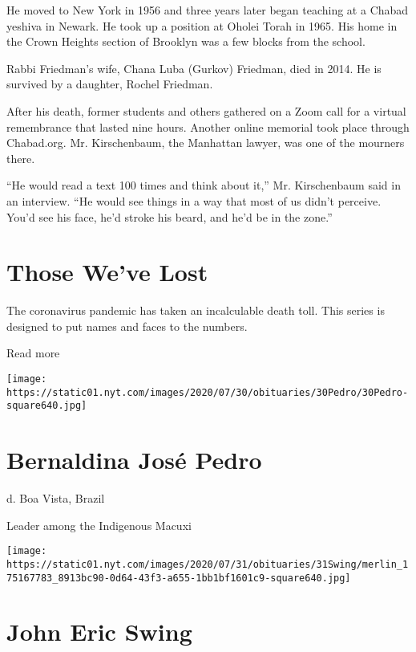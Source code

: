 He moved to New York in 1956 and three years later began teaching at a
Chabad yeshiva in Newark. He took up a position at Oholei Torah in 1965.
His home in the Crown Heights section of Brooklyn was a few blocks from
the school.

Rabbi Friedman's wife, Chana Luba (Gurkov) Friedman, died in 2014. He is
survived by a daughter, Rochel Friedman.

After his death, former students and others gathered on a Zoom call for
a virtual remembrance that lasted nine hours. Another online memorial
took place through Chabad.org. Mr. Kirschenbaum, the Manhattan lawyer,
was one of the mourners there.

``He would read a text 100 times and think about it,'' Mr. Kirschenbaum
said in an interview. ``He would see things in a way that most of us
didn't perceive. You'd see his face, he'd stroke his beard, and he'd be
in the zone.''

\href{https://www.nytimes.com/interactive/2020/obituaries/people-died-coronavirus-obituaries.html?action=click\&pgtype=Article\&state=default\&region=BELOW_MAIN_CONTENT\&context=covid_obits_promo}{}

\hypertarget{those-weve-lost}{%
\section{Those We've Lost}\label{those-weve-lost}}

The coronavirus pandemic has taken an incalculable death toll. This
series is designed to put names and faces to the numbers.

Read more

\texttt{[image: https://static01.nyt.com/images/2020/07/30/obituaries/30Pedro/30Pedro-square640.jpg]}

\hypertarget{bernaldina-josuxe9-pedro}{%
\section{Bernaldina José Pedro}\label{bernaldina-josuxe9-pedro}}

d. Boa Vista, Brazil

Leader among the Indigenous Macuxi

\texttt{[image: https://static01.nyt.com/images/2020/07/31/obituaries/31Swing/merlin\_175167783\_8913bc90-0d64-43f3-a655-1bb1bf1601c9-square640.jpg]}

\hypertarget{john-eric-swing}{%
\section{John Eric Swing}\label{john-eric-swing}}

